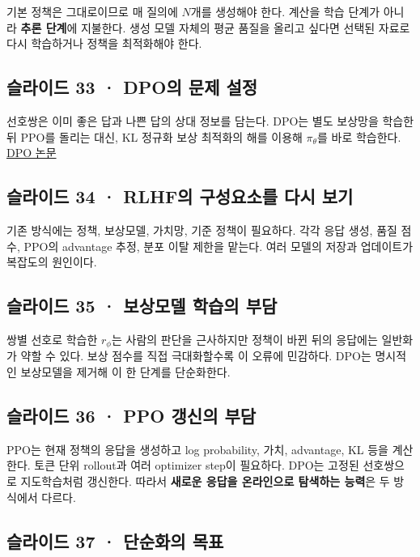 \documentclass[11pt,a4paper]{article}
\begin{document}
기본 정책은 그대로이므로 매 질의에 $N$개를 생성해야 한다. 계산을 학습 단계가 아니라 \textbf{추론 단계}에 지불한다. 생성 모델 자체의 평균 품질을 올리고 싶다면 선택된 자료로 다시 학습하거나 정책을 최적화해야 한다.\par

\subsection{슬라이드 33 · DPO의 문제 설정}

선호쌍은 이미 좋은 답과 나쁜 답의 상대 정보를 담는다. DPO는 별도 보상망을 학습한 뒤 PPO를 돌리는 대신, KL 정규화 보상 최적화의 해를 이용해 $\pi_\theta$를 바로 학습한다. \href{https://arxiv.org/abs/2305.18290}{DPO 논문}\par

\subsection{슬라이드 34 · RLHF의 구성요소를 다시 보기}

기존 방식에는 정책, 보상모델, 가치망, 기준 정책이 필요하다. 각각 응답 생성, 품질 점수, PPO의 advantage 추정, 분포 이탈 제한을 맡는다. 여러 모델의 저장과 업데이트가 복잡도의 원인이다.\par

\subsection{슬라이드 35 · 보상모델 학습의 부담}

쌍별 선호로 학습한 $r_\phi$는 사람의 판단을 근사하지만 정책이 바뀐 뒤의 응답에는 일반화가 약할 수 있다. 보상 점수를 직접 극대화할수록 이 오류에 민감하다. DPO는 명시적인 보상모델을 제거해 이 한 단계를 단순화한다.\par

\subsection{슬라이드 36 · PPO 갱신의 부담}

PPO는 현재 정책의 응답을 생성하고 log probability, 가치, advantage, KL 등을 계산한다. 토큰 단위 rollout과 여러 optimizer step이 필요하다. DPO는 고정된 선호쌍으로 지도학습처럼 갱신한다. 따라서 \textbf{새로운 응답을 온라인으로 탐색하는 능력}은 두 방식에서 다르다.\par

\subsection{슬라이드 37 · 단순화의 목표}
\end{document}
